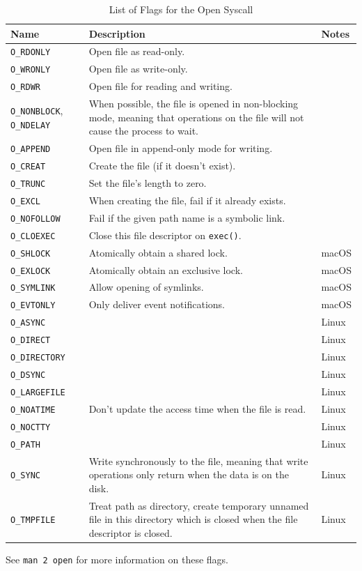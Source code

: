 \documentclass[a4paper]{article}
\begin{document}
\begin{table}
\renewcommand{\arraystretch}{1.25}
\centering\caption{List of Flags for the Open Syscall}\label{tbl:oflags}
\begin{tabular}{@{}p{2cm}p{7.5cm}p{1.5cm}@{}}
\toprule
Name & Description & Notes\\
\midrule
\verb|O_RDONLY|
& Open file as read-only.
&\\
\verb|O_WRONLY|
& Open file as write-only.
&\\
\verb|O_RDWR|
& Open file for reading and writing.
&\\
\verb|O_NONBLOCK|, \verb|O_NDELAY|
& When possible, the file is opened in non-blocking mode, meaning that operations on the file will not cause the process to wait.
&\\
\verb|O_APPEND|
& Open file in append-only mode for writing.
&\\
\verb|O_CREAT|
& Create the file (if it doesn't exist).
&\\
\verb|O_TRUNC|
& Set the file's length to zero.
&\\
\verb|O_EXCL|
& When creating the file, fail if it already exists.
&\\
\verb|O_NOFOLLOW|
& Fail if the given path name is a symbolic link.
&\\
\verb|O_CLOEXEC|
& Close this file descriptor on \verb|exec()|.
&\\
\verb|O_SHLOCK|
& Atomically obtain a shared lock.
& macOS\\
\verb|O_EXLOCK|
& Atomically obtain an exclusive lock.
& macOS\\
\verb|O_SYMLINK|
& Allow opening of symlinks. %
& macOS\\
\verb|O_EVTONLY|
& Only deliver event notifications.
& macOS\\
\verb|O_ASYNC|
&
& Linux\\
\verb|O_DIRECT|
&
& Linux\\
\verb|O_DIRECTORY|
&
& Linux\\
\verb|O_DSYNC|
&
& Linux\\
\verb|O_LARGEFILE|
&
& Linux\\
\verb|O_NOATIME|
& Don't update the access time when the file is read.
& Linux\\
\verb|O_NOCTTY|
&
& Linux\\
\verb|O_PATH|
&
& Linux\\
\verb|O_SYNC|
& Write synchronously to the file, meaning that write operations only return when the data is on the disk.
& Linux\\
\verb|O_TMPFILE|
& Treat path as directory, create temporary unnamed file in this directory which is closed when the file descriptor is closed. 
& Linux\\
\bottomrule
\end{tabular}

\footnotesize
See \texttt{man 2 open} for more information on these flags.
\end{table}
\end{document}
